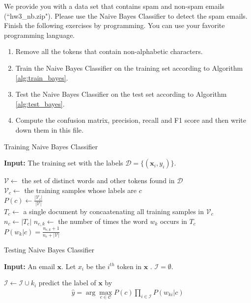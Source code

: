 \documentclass[11pt,letter,notitlepage]{article}
\begin{document}
\newpage
\begin{exercise}
We provide you with a data set that contains spam and non-spam emails (``hw3\_nb.zip"). Please use the Naive Bayes Classifier to detect the spam emails.
Finish the following exercises by programming. You can use your favorite programming language.
\begin{enumerate}
\item Remove all the tokens that contain non-alphabetic characters.
\item Train the Naive Bayes Classifier on the training set according to Algorithm \ref{alg:train_bayes}.
\item Test the Naive Bayes Classifier on the test set according to Algorithm \ref{alg:test_bayes}.
\item Compute the confusion matrix, precision, recall and F1 score and then write down them in this file.
\end{enumerate}

\end{exercise}

\begin{algorithm}
\caption{Training Naive Bayes Classifier}
\label{alg:train_bayes}
\textbf{Input:} The training set with the labels $\mathcal{D}=\{(\textbf{x}_i,y_i)\}.$
\begin{algorithmic}[1]
\STATE $\mathcal{V}\leftarrow$ the set of distinct words and other tokens found in $\mathcal{D}$\\
\STATE $\mathcal{V}_c\leftarrow$ the training samples whose labels are $c$\\
\STATE $P(c)\leftarrow\frac{|\mathcal{V}_c|}{|\mathcal{V}|}$\\
\STATE $T_c\leftarrow$ a single document by concaatenating all training samples in $\mathcal{V}_c$\\
\STATE $n_c\leftarrow |T_c|$
\STATE $n_{c,k}\leftarrow$ the number of times the word $w_k$ occurs in $T_c$\\
\STATE $P(w_k|c)=\frac{n_{c,k}+1}{n_c+|\mathcal{V}|}$
\ENDFOR
\ENDFOR
\end{algorithmic}
\end{algorithm}

\begin{algorithm}
\caption{Testing Naive Bayes Classifier }
\label{alg:test_bayes}
\textbf{Input:} An email $\textbf{x}$. Let $x_i$ be the $i^{th}$ token in $\textbf{x}$ . $\mathcal{I}=\emptyset.$
\begin{algorithmic}[1]
\STATE $\mathcal{I}\leftarrow\mathcal{I}\cup k_i$
\ENDIF
\ENDFOR
\STATE predict the label of $\textbf{x}$ by 
\begin{align*}
    \hat{y}=\arg\max_{c\in\mathcal{C}} P(c)\prod_{i\in\mathcal{I}}P(w_{ki}|c)
\end{align*}
\end{algorithmic}
\end{algorithm}
\end{document}
